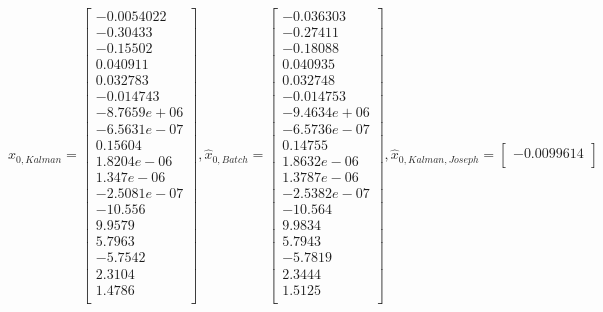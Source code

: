 \documentclass[]{article}
\newcommand{\brackets} [1] {\left[ #1 \right]}
\begin{document}
\begin{displaymath}
	\hat{x}_{0,Kalman}  =  
	\brackets{\begin{array}{c}
	   -0.0054022	\\
	     -0.30433	\\
	     -0.15502	\\
	     0.040911	\\
	     0.032783	\\
	    -0.014743	\\
	  -8.7659e+06	\\
	  -6.5631e-07	\\
	      0.15604	\\
	   1.8204e-06	\\
	    1.347e-06	\\
 	 -2.5081e-07	\\
 	     -10.556	\\
 	      9.9579	\\
 	      5.7963	\\
 	     -5.7542	\\
 	      2.3104	\\
	       1.4786	\\
	\end{array}}
	,
	\hat{x}_{0,Batch}  =  
	\brackets{\begin{array}{c}
	    -0.036303	\\
	     -0.27411	\\
	     -0.18088	\\
	     0.040935	\\
	     0.032748	\\
	    -0.014753	\\
	  -9.4634e+06	\\
	  -6.5736e-07	\\
	      0.14755	\\
	   1.8632e-06	\\
	   1.3787e-06	\\
	  -2.5382e-07	\\
	      -10.564	\\
	       9.9834	\\
	       5.7943	\\
	      -5.7819	\\
  	     2.3444		\\
	       1.5125	\\
	\end{array}}
,
	\hat{x}_{0,Kalman,Joseph}  =  
	\brackets{\begin{array}{c}
	      -0.0099614	\\

\end{array}}
\end{displaymath}
\end{document}
